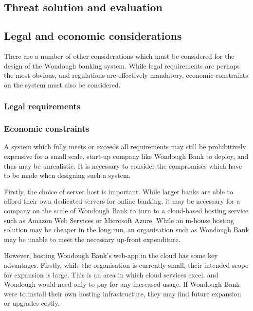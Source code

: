 \subsection{Threat solution and evaluation}



\subsection{Legal and economic considerations}

There are a number of other considerations which must be considered for the design of the Wondough banking system. While legal requirements are perhaps the most obvious, and regulations are effectively mandatory, economic constraints on the system must also be considered.

\subsubsection{Legal requirements}



\subsubsection{Economic constraints}

A system which fully meets or exceeds all requirements may still be prohibitively expensive for a small scale, start-up company like Wondough Bank to deploy, and thus may be unrealistic. It is necessary to consider the compromises which have to be made when designing such a system. 


Firstly, the choice of server host is important. While larger banks are able to afford their own dedicated servers for online banking, it may be necessary for a company on the scale of Wondough Bank to turn to a cloud-based hosting service such as Amazon Web Services or Microsoft Azure. While an in-house hosting solution may be cheaper in the long run, an organisation such as Wondough Bank may be unable to meet the necessary up-front expenditure.

However, hosting Wondough Bank's web-app in the cloud has some key advantages. Firstly, while the organisation is currently small, their intended scope for expansion is large. This is an area in which cloud services excel, and Wondough would need only to pay for any increased usage. If Wondough Bank were to install their own hosting infrastructure, they may find future expansion or upgrades costly.

